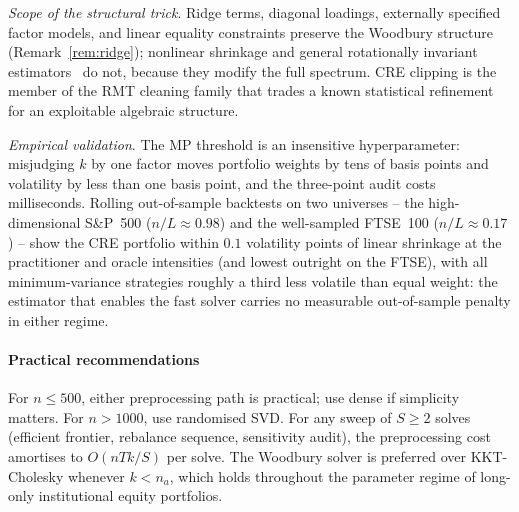 \emph{Scope of the structural trick}. Ridge terms, diagonal loadings,
externally specified factor models, and linear equality constraints preserve
the Woodbury structure (Remark~\ref{rem:ridge}); nonlinear shrinkage and
general rotationally invariant estimators~\cite{ledoitpeche2011,ledoit2012,bun2017}
do not, because they modify the full spectrum. CRE clipping is the member of
the RMT cleaning family that trades a known statistical refinement for an
exploitable algebraic structure.

\emph{Empirical validation}. The MP threshold is an insensitive
hyperparameter: misjudging $k$ by one factor moves portfolio weights by tens
of basis points and volatility by less than one basis point, and the
three-point audit costs milliseconds. Rolling out-of-sample backtests on two
universes -- the high-dimensional S\&P~500 ($n/L \approx 0.98$) and the
well-sampled FTSE~100 ($n/L \approx 0.17$) -- show the CRE portfolio within
$0.1$ volatility points of linear shrinkage at the practitioner and oracle
intensities (and lowest outright on the FTSE), with all minimum-variance
strategies roughly a third less volatile than equal weight: the estimator
that enables the fast solver carries no measurable out-of-sample penalty in
either regime.

\paragraph{Practical recommendations}
For $n \leq 500$, either preprocessing path is practical; use dense if simplicity
matters. For $n > 1000$, use randomised SVD. For any sweep of $S \geq 2$ solves
(efficient frontier, rebalance sequence, sensitivity audit), the
preprocessing cost amortises to $O(nTk/S)$ per solve. The Woodbury solver is
preferred over KKT-Cholesky whenever $k < n_a$, which holds throughout the
parameter regime of long-only institutional equity portfolios.
